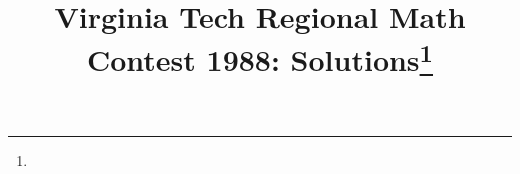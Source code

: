 \documentclass[10pt]{article}
\begin{document}
\title{Virginia Tech Regional Math Contest 1988: Solutions\footnote{\disclaimer}}
\author{\vspace{-2ex}}
\date{\vspace{-5ex}} %
\maketitle

%

%

%

%

%

%

%

%
\end{document}
